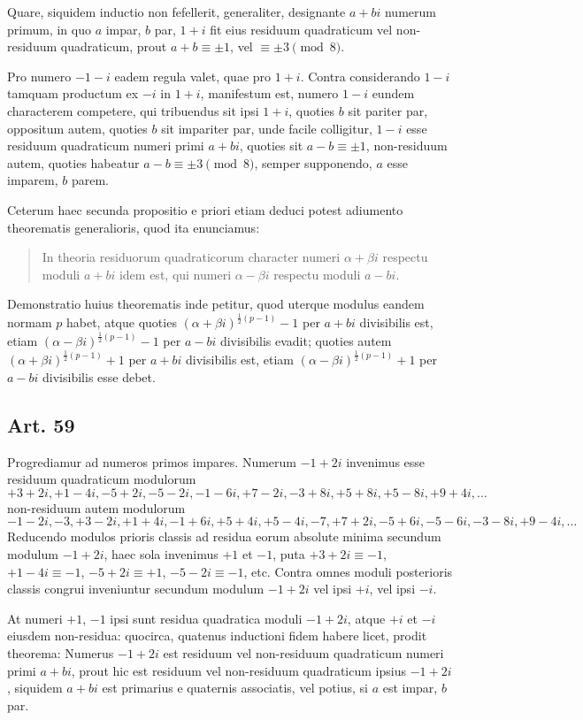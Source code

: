 \documentclass[12pt]{article}
\newcommand{\art}[1]{\subsection*{Art. #1}}
\begin{document}
Quare, siquidem inductio non fefellerit, generaliter, designante $a+bi$ numerum primum, in quo $a$ impar, $b$ par, $1+i$ fit eius residuum quadraticum vel non-residuum quadraticum, prout $a+b\equiv\pm1$, vel $\equiv\pm3\pmod 8$.

Pro numero $-1-i$ eadem regula valet, quae pro $1+i$. Contra considerando $1-i$ tamquam productum ex $-i$ in $1+i$, manifestum est, numero $1-i$ eundem characterem competere, qui tribuendus sit ipsi $1+i$, quoties $b$ sit pariter par, oppositum autem, quoties $b$ sit impariter par, unde facile colligitur, $1-i$ esse residuum quadraticum numeri primi $a+bi$, quoties sit $a-b\equiv\pm1$, non-residuum autem, quoties habeatur $a-b\equiv\pm3\pmod 8$, semper supponendo, $a$ esse imparem, $b$ parem.

Ceterum haec secunda propositio e priori etiam deduci potest adiumento theorematis generalioris, quod ita enunciamus:

\begin{quote}
In theoria residuorum quadraticorum character numeri $\alpha+\beta i$ respectu moduli $a+bi$ idem est, qui numeri $\alpha-\beta i$ respectu moduli $a-bi$.
\end{quote}
Demonstratio huius theorematis inde petitur, quod uterque modulus eandem normam $p$ habet, atque quoties $(\alpha+\beta i)^{\frac12(p-1)}-1$ per $a+bi$ divisibilis est, etiam $(\alpha-\beta i)^{\frac12(p-1)}-1$ per $a-bi$ divisibilis evadit; quoties autem $(\alpha+\beta i)^{\frac12(p-1)}+1$ per $a+bi$ divisibilis est, etiam $(\alpha-\beta i)^{\frac12(p-1)}+1$ per $a-bi$ divisibilis esse debet.

\art{59}
Progrediamur ad numeros primos impares. Numerum $-1+2i$ invenimus esse residuum quadraticum modulorum
\[
+3+2i,
+1-4i,
-5+2i,
-5-2i,
-1-6i,
+7-2i,
-3+8i,
+5+8i,
+5-8i,
+9+4i,\ldots
\]
non-residuum autem modulorum
\[
-1-2i,
-3,
+3-2i,
+1+4i,
-1+6i,
+5+4i,
+5-4i,
-7,
+7+2i,
-5+6i,
-5-6i,
-3-8i,
+9-4i,\ldots
\]
Reducendo modulos prioris classis ad residua eorum absolute minima secundum modulum $-1+2i$, haec sola invenimus $+1$ et $-1$, puta $+3+2i\equiv-1$, $+1-4i\equiv-1$, $-5+2i\equiv+1$, $-5-2i\equiv-1$, etc. Contra omnes moduli posterioris classis congrui inveniuntur secundum modulum $-1+2i$ vel ipsi $+i$, vel ipsi $-i$.

At numeri $+1$, $-1$ ipsi sunt residua quadratica moduli $-1+2i$, atque $+i$ et $-i$ eiusdem non-residua: quocirca, quatenus inductioni fidem habere licet, prodit theorema: Numerus $-1+2i$ est residuum vel non-residuum quadraticum numeri primi $a+bi$, prout hic est residuum vel non-residuum quadraticum ipsius $-1+2i$, siquidem $a+bi$ est primarius e quaternis associatis, vel potius, si $a$ est impar, $b$ par.
\end{document}
